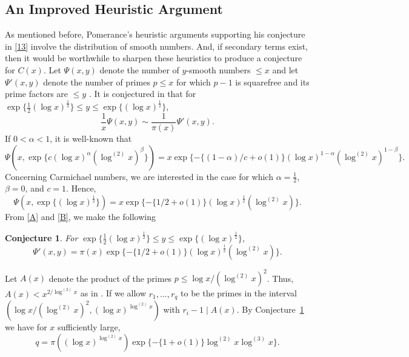 \documentclass[11pt]{article}
\theoremstyle{plain}
\newtheorem{conj}[subsubsection]{Conjecture}
\theoremstyle{definition}
\theoremstyle{remark}
\numberwithin{equation}{subsection}
\begin{document}
\subsection{An Improved Heuristic Argument}
As mentioned before, Pomerance's heuristic arguments supporting his conjecture in \eqref{13} involve the distribution of smooth numbers. And, if secondary terms exist, then it would be worthwhile to sharpen these heuristics to produce a conjecture for $C(x)$. Let $\Psi(x,y)$ denote the number of $y$-smooth numbers $\le x$ and let $\Psi'(x,y)$ denote the number of primes $p \le x$ for which $p-1$ is squarefree and its prime factors are $\le y$ \cite{10}. It is conjectured in \cite{11} that for $\exp\{\frac{1}{2}(\log x)^{\frac{1}{2}}\} \le y \le \exp\{(\log x)^{\frac{1}{2}}\}$,
\begin{equation} \label{A}
\frac{1}{x}\Psi(x,y) \sim \frac{1}{\pi(x)}\Psi'(x,y).
\end{equation}
If $0 < \alpha < 1$, it is well-known \cite{29} that
\begin{equation}
\Psi\left(x,\exp\{c(\log x)^{\alpha}(\log^{(2)} x)^{\beta}\}\right) = x \exp\{-\{(1-\alpha)/c+o(1)\}(\log x)^{1-\alpha}(\log^{(2)} x)^{1-\beta}\}.
\end{equation}
Concerning Carmichael numbers, we are interested in the case for which $\alpha = \frac{1}{2}$, $\beta = 0$, and $c = 1$. Hence,
\begin{equation} \label{B}
\Psi\left(x,\exp\{(\log x)^{\frac{1}{2}}\}\right) = x \exp\{-\{1/2+o(1)\}(\log x)^{\frac{1}{2}}(\log^{(2)} x)\}.
\end{equation}
From \eqref{A} and \eqref{B}, we make the following
\begin{conj} \label{smooth}
For $\exp\{\frac{1}{2}(\log x)^{\frac{1}{2}}\} \le y \le \exp\{(\log x)^{\frac{1}{2}}\}$,
\begin{equation}
\Psi'(x,y) = \pi(x)\exp\{-\{1/2+o(1)\}(\log x)^{\frac{1}{2}}(\log^{(2)} x)\}.
\end{equation}
\end{conj}
Let $A(x)$ denote the product of the primes $p \le \log x/(\log^{(2)} x)^2$. Thus, $A(x) < x^{2/\log^{(2)} x}$ as in \cite{10}. If we allow $r_1,\ldots,r_q$ to be the primes in the interval $\left(\log x/(\log^{(2)} x)^2,(\log x)^{\log^{(2)} x}\right)$ with $r_i-1 \mid A(x)$. By Conjecture~\ref{smooth} we have for $x$ sufficiently large,
\begin{equation}
q = \pi\left((\log x)^{\log^{(2)} x}\right)\exp\{-\{1+o(1)\}\log^{(2)} x \log^{(3)} x\}.
\end{equation}
\end{document}
